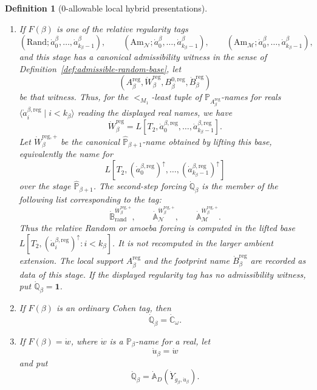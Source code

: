 \documentclass[a4paper,11pt]{article}
\newtheorem{definition}[theorem]{Definition}
\begin{document}
\begin{definition}[\(0\)-allowable local hybrid presentations]
\begin{enumerate}
   \item If \(F(\beta)\) is one of the relative regularity tags
   \[
      (\mathrm{Rand};\dot a^\beta_0,\ldots,
         \dot a^\beta_{k_\beta-1}),
      \qquad
      (\mathrm{Am}_{\mathcal N};\dot a^\beta_0,\ldots,
         \dot a^\beta_{k_\beta-1}),
      \qquad
      (\mathrm{Am}_{\mathcal M};\dot a^\beta_0,\ldots,
         \dot a^\beta_{k_\beta-1}),
   \]
   and this stage has a canonical admissibility witness in the sense of
   Definition~\ref{def:admissible-random-base}, let
   \[
      (A^{\mathrm{reg}}_\beta,
       \dot W^{\mathrm{reg}}_\beta,
       B^{0,\mathrm{reg}}_\beta,
       \dot B^{\mathrm{reg}}_\beta)
   \]
   be that witness.  Thus, for the \(<_{M_1}\)-least tuple of
   \(\mathbb P_{A^{\mathrm{reg}}_\beta}\)-names for reals
   \(\langle\dot a^{\beta,\mathrm{reg}}_i\mid i<k_\beta\rangle\) reading the
   displayed real names, we have
   \[
      \dot W^{\mathrm{reg}}_\beta
      =L[T_2,
          \dot a^{\beta,\mathrm{reg}}_0,
          \ldots,
          \dot a^{\beta,\mathrm{reg}}_{k_\beta-1}].
   \]
   Let \(\dot W^{\mathrm{reg},+}_\beta\) be the canonical
   \(\widehat{\mathbb P}_{\beta+1}\)-name obtained by lifting this base, equivalently
   the name for
   \[
      L[T_2,
        (\dot a^{\beta,\mathrm{reg}}_0)^{\uparrow},\ldots,
        (\dot a^{\beta,\mathrm{reg}}_{k_\beta-1})^{\uparrow}]
   \]
   over the stage \(\widehat{\mathbb P}_{\beta+1}\).  The second-step forcing
   \(\dot{\mathbb Q}_\beta\) is the member of the following list corresponding
   to the tag:
   \[
      \dot{\mathbb B}_{\mathrm{rand}}^{\dot W^{\mathrm{reg},+}_\beta},
      \qquad
      \dot{\mathbb A}_{\mathcal N}^{\dot W^{\mathrm{reg},+}_\beta},
      \qquad
      \dot{\mathbb A}_{\mathcal M}^{\dot W^{\mathrm{reg},+}_\beta}.
   \]
   Thus the relative Random or amoeba forcing is computed in the lifted base
   \(L[T_2,(\dot a^{\beta,\mathrm{reg}}_i)^{\uparrow}:i<k_\beta]\).  It is not
   recomputed in the larger ambient extension.  The local support
   \(A^{\mathrm{reg}}_\beta\) and the footprint name
   \(\dot B^{\mathrm{reg}}_\beta\) are recorded as data of this stage.  If the
   displayed regularity tag has no admissibility witness, put
   \(\dot{\mathbb Q}_\beta=\mathbf 1\).

   \item If \(F(\beta)\) is an ordinary Cohen tag, then
   \[
      \dot{\mathbb Q}_\beta=\dot{\mathbb C}_\omega.
   \]

   \item If \(F(\beta)=\dot w\), where \(\dot w\) is a
   \(\mathbb P_\beta\)-name for a real, let
   \[
      \dot u_\beta=\dot w
   \]
   and put
   \[
      \dot{\mathbb Q}_\beta
      =
      \dot{\mathbb A}_D(\dot Y_{\dot g_\beta,\dot u_\beta}).
   \]


\end{enumerate}
\end{definition}
\end{document}
